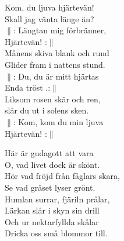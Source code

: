 \documentclass[a6paper,10pt]{article}
\begin{document}
\setlength{\oddsidemargin}{-0.37in}
\noindent
\begin{center}
\end{center}
\begin{lyrics}
Kom, du ljuva hjärtevän!\\
Skall jag vänta länge än?\\
$\|$: Längtan mig förbränner,\\
Hjärtevän! :$\|$
\vspace{5pt}\\
Månens skiva blank och rund\\
Glider fram i nattens stund.\\
$\|$: Du, du är mitt hjärtas\\
Enda tröst .:$\|$
\vspace{5pt}\\
Liksom rosen skär och ren,\\
slår du ut i solens sken.\\
$\|$: Kom, kom du min ljuva\\
Hjärtevän! :$\|$
\end{lyrics}
\vspace{30pt}
\begin{center}
\end{center}
\begin{lyrics}
Här är gudagott att vara\\
O, vad livet dock är skönt.\\
Hör vad fröjd från fåglars skara,\\
Se vad gräset lyser grönt.\\
Humlan surrar, fjäriln prålar,\\
Lärkan slår i skyn sin drill\\
Och ur nektarfyllda skålar\\
Dricka oss små blommor till. 
\end{lyrics}
\end{document}

